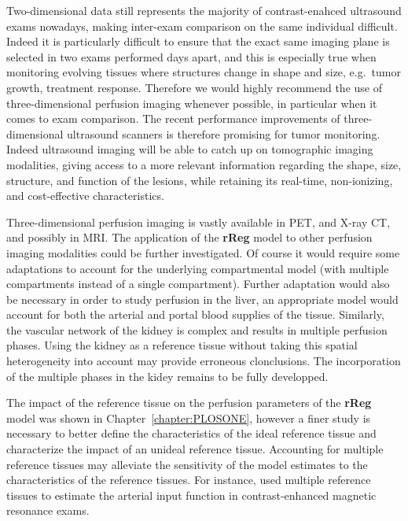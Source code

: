 Two-dimensional data still represents the majority of contrast-enahced ultrasound exams nowadays, making inter-exam comparison on the same individual difficult.
Indeed it is particularly difficult to ensure that the exact same imaging plane is selected in two exams performed days apart, and this is especially true when monitoring evolving tissues where structures change in shape and size, e.g.~tumor growth, treatment response.
Therefore we would highly recommend the use of three-dimensional perfusion imaging whenever possible, in particular when it comes to exam comparison.
The recent performance improvements of three-dimensional ultrasound scanners is therefore promising for tumor monitoring.
Indeed ultrasound imaging will be able to catch up on tomographic imaging modalities, giving access to a more relevant information regarding the shape, size, structure, and function of the lesions, while retaining its real-time, non-ionizing, and cost-effective characteristics.

Three-dimensional perfusion imaging is vastly available in PET, and X-ray CT, and possibly in MRI.
The application of the \textbf{rReg} model to other perfusion imaging modalities could be further investigated.
Of course it would require some adaptations to account for the underlying compartmental model (with multiple compartments instead of a single compartment).
Further adaptation would also be necessary in order to study perfusion in the liver, an appropriate model would account for both the arterial and portal blood supplies of the tissue.
Similarly, the vascular network of the kidney is complex and results in multiple perfusion phases.
Using the kidney as a reference tissue without taking this spatial heterogeneity into account may provide erroneous clonclusions.
The incorporation of the multiple phases in the kidey remains to be fully developped.

The impact of the reference tissue on the perfusion parameters of the \textbf{rReg} model was shown in Chapter~\ref{chapter:PLOSONE}, however a finer study is necessary to better define the characteristics of the ideal reference tissue and characterize the impact of an unideal reference tissue. 
Accounting for multiple reference tissues may alleviate the sensitivity of the model estimates to the characteristics of the reference tissues. 
For instance, \citet{Yang:2007ki} used multiple reference tissues to estimate the arterial input function in contrast-enhanced magnetic resonance exams.

